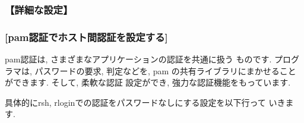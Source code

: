 \documentclass[a4paper,titlepage]{jreport}
\begin{document}
\subsubsection{【詳細な設定】}
\subsubsection{[pam認証でホスト間認証を設定する]}

          pam認証は, さまざまなアプリケーションの認証を共通に扱う
          ものです. プログラマは, パスワードの要求, 判定などを, pam
          の共有ライブラリにまかせることができます. そして, 柔軟な認証
          設定ができ, 強力な認証機能をもっています.

          具体的にrsh, rloginでの認証をパスワードなしにする設定を以下行って
          いきます. 
\end{document}
